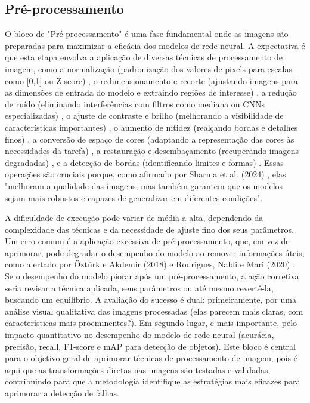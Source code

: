 \subsection{Pré-processamento}
O bloco de "Pré-processamento" é uma fase fundamental onde as imagens são preparadas para maximizar a eficácia dos modelos de rede neural. A expectativa é que esta etapa envolva a aplicação de diversas técnicas de processamento de imagem, como a normalização (padronização dos valores de pixels para escalas como [0,1] ou Z-score) \cite{Sharma2024}, o redimensionamento e recorte (ajustando imagens para as dimensões de entrada do modelo e extraindo regiões de interesse) \cite{Sharma2024}, a redução de ruído (eliminando interferências com filtros como mediana ou CNNs especializadas) \cite{Sharma2024}, o ajuste de contraste e brilho (melhorando a visibilidade de características importantes) \cite{Sharma2024}, o aumento de nitidez (realçando bordas e detalhes finos) \cite{Sharma2024}, a conversão de espaço de cores (adaptando a representação das cores às necessidades da tarefa) \cite{Sharma2024}, a restauração e desembaçamento (recuperando imagens degradadas) \cite{Sharma2024}, e a detecção de bordas (identificando limites e formas) \cite{Sharma2024}. Essas operações são cruciais porque, como afirmado por Sharma et al. (2024) \cite{Sharma2024}, elas "melhoram a qualidade das imagens, mas também garantem que os modelos sejam mais robustos e capazes de generalizar em diferentes condições".

A dificuldade de execução pode variar de média a alta, dependendo da complexidade das técnicas e da necessidade de ajuste fino dos seus parâmetros. Um erro comum é a aplicação excessiva de pré-processamento, que, em vez de aprimorar, pode degradar o desempenho do modelo ao remover informações úteis, como alertado por Öztürk e Akdemir (2018) \cite{Ozturk2018} e Rodrigues, Naldi e Mari (2020) \cite{Rodrigues2020}. Se o desempenho do modelo piorar após um pré-processamento, a ação corretiva seria revisar a técnica aplicada, seus parâmetros ou até mesmo revertê-la, buscando um equilíbrio. A avaliação do sucesso é dual: primeiramente, por uma análise visual qualitativa das imagens processadas (elas parecem mais claras, com características mais proeminentes?). Em segundo lugar, e mais importante, pelo impacto quantitativo no desempenho do modelo de rede neural (acurácia, precisão, recall, F1-score e mAP para detecção de objetos). Este bloco é central para o objetivo geral de aprimorar técnicas de processamento de imagem, pois é aqui que as transformações diretas nas imagens são testadas e validadas, contribuindo para que a metodologia identifique as estratégias mais eficazes para aprimorar a detecção de falhas.

